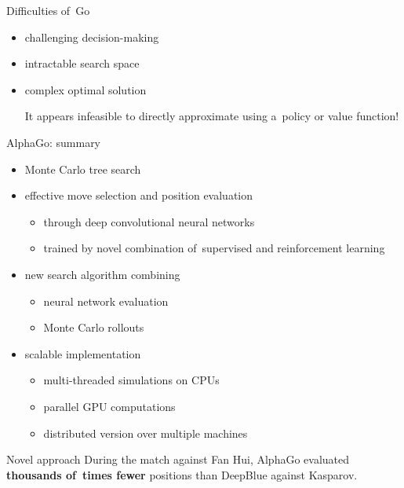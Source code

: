 \documentclass{beamer}
\begin{document}
  {
    \begin{frame}{Difficulties of~Go}
      \begin{itemize}[<+- | alert@+>]
        \item challenging decision-making
        \item intractable search space
        \item complex optimal solution

          {\tiny It appears infeasible to directly approximate using a~policy or value function!}
      \end{itemize}
    \end{frame}

    \begin{frame}{AlphaGo: summary}
      \begin{itemize}[<+- | alert@+>]
        \item Monte Carlo tree search
        \item effective move selection and position evaluation 
          \begin{itemize}[<+- | alert@+>]
            \item through deep convolutional neural networks
            \item trained by novel combination of~supervised and reinforcement learning
          \end{itemize}
        \item new search algorithm combining
          \begin{itemize}[<+- | alert@+>]
            \item neural network evaluation
            \item Monte Carlo rollouts
          \end{itemize}
        \item scalable implementation
          \begin{itemize}[<+- | alert@+>]
            \item multi-threaded simulations on CPUs
            \item parallel GPU computations
            \item distributed version over multiple machines
          \end{itemize}
      \end{itemize}
    \end{frame}

    \begin{frame}{Novel approach}
      \pause
      During the match against Fan Hui, AlphaGo evaluated \textbf{thousands of~times fewer} positions than DeepBlue against Kasparov.
      \pause


\end{frame}}
\end{document}

